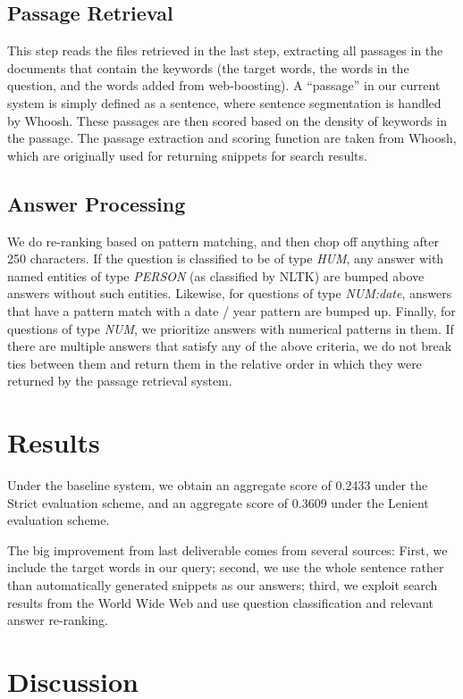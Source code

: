 \documentclass[11pt]{article}
\begin{document}
\subsection{Passage Retrieval}
This step reads the files retrieved in the last step, extracting all passages in the documents that contain the keywords (the target words, the words in the question, and the words added from web-boosting). A ``passage'' in our current system is simply defined as a sentence, where sentence segmentation is handled by Whoosh. These passages are then scored based on the density of keywords in the passage. The passage extraction and scoring function are taken from Whoosh, which are originally used for returning snippets for search results.

\subsection{Answer Processing}
We do re-ranking based on pattern matching, and then chop off anything after 250 characters. If the question is classified to be of type \emph{HUM}, any answer with named entities of type \emph{PERSON} (as classified by NLTK) are bumped above answers without such entities. Likewise, for questions of type \emph{NUM:date}, answers that have a pattern match with a date / year pattern are bumped up. Finally, for questions of type \emph{NUM}, we prioritize answers with numerical patterns in them. If there are multiple answers that satisfy any of the above criteria, we do not break ties between them and return them in the relative order in which they were returned by the passage retrieval system.

\section{Results}

Under the baseline system, we obtain an aggregate score of 0.2433 under the Strict evaluation scheme, and an aggregate score of 0.3609 under the Lenient evaluation scheme.

The big improvement from last deliverable comes from several sources: First, we include the target words in our query; second, we use the whole sentence rather than automatically generated snippets as our answers; third, we exploit search results from the World Wide Web and use question classification and relevant answer re-ranking.

\section{Discussion}
\label{sec:discussion}
\end{document}
